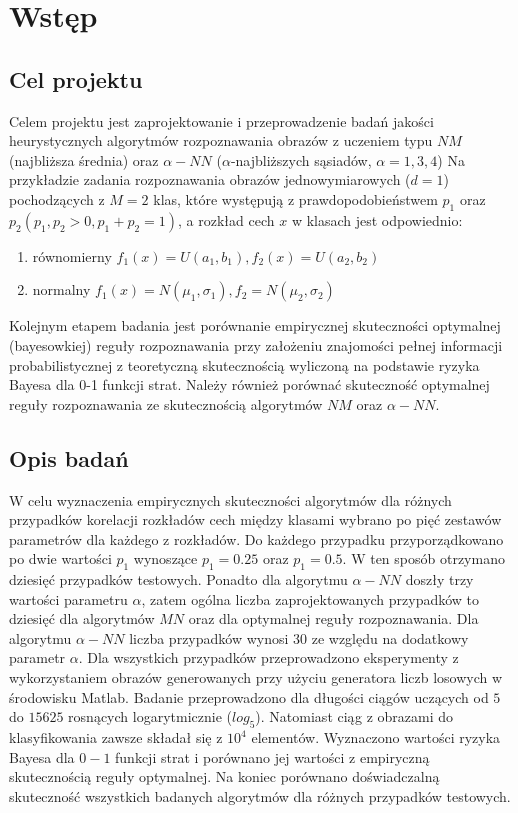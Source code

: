 \section{Wstęp}
	\subsection{Cel projektu}

	Celem projektu jest zaprojektowanie i przeprowadzenie badań jakości heurystycznych algorytmów rozpoznawania obrazów z uczeniem typu $NM$  (najbliższa średnia) oraz $\alpha-NN$ ($\alpha$-najbliższych sąsiadów, $ \alpha=1,3,4$) Na przykładzie zadania rozpoznawania obrazów jednowymiarowych ($d=1$) pochodzących z $M = 2$ klas, które występują z prawdopodobieństwem $p_1$ oraz $p_2 (p_1,p_2>0, p_1+p_2=1)$, a rozkład cech $x$ w klasach jest odpowiednio:
	\begin{enumerate}
	\item równomierny $f_1(x)=U(a_1,b_1), f_2(x)=U(a_2,b_2)$
	\item normalny $f_1(x)=N(\mu_1, \sigma_1), f_2=N(\mu_2, \sigma_2)$
	\end{enumerate}
	Kolejnym etapem badania jest porównanie empirycznej skuteczności optymalnej (bayesowkiej) reguły rozpoznawania przy założeniu znajomości pełnej informacji probabilistycznej z teoretyczną skutecznością wyliczoną na podstawie ryzyka Bayesa dla 0-1 funkcji strat. Należy również porównać skuteczność optymalnej reguły rozpoznawania ze skutecznością algorytmów $NM$ oraz $\alpha-NN$.
	
	\subsection{Opis badań}
	
	W celu wyznaczenia empirycznych skuteczności algorytmów dla różnych przypadków korelacji rozkładów cech między klasami wybrano po pięć zestawów parametrów dla każdego z rozkładów. Do każdego przypadku przyporządkowano po dwie wartości $p_1$ wynoszące $p_1=0.25$ oraz $p_1=0.5$. W ten sposób otrzymano dziesięć przypadków testowych. Ponadto dla algorytmu $\alpha-NN$ doszły trzy wartości parametru $\alpha$, zatem ogólna liczba zaprojektowanych przypadków to dziesięć dla algorytmów $MN$ oraz dla optymalnej reguły rozpoznawania. Dla algorytmu $\alpha-NN$ liczba przypadków wynosi 30 ze względu na dodatkowy parametr $\alpha$. \newline
	Dla wszystkich przypadków przeprowadzono eksperymenty z wykorzystaniem obrazów generowanych przy użyciu generatora liczb losowych w środowisku  Matlab. Badanie przeprowadzono dla długości ciągów uczących od $5$ do $15 625$ rosnących logarytmicznie ($log_5$). Natomiast ciąg z obrazami do klasyfikowania zawsze składał się z $10^4$ elementów.
	Wyznaczono wartości ryzyka Bayesa dla $0-1$ funkcji strat i porównano jej wartości z empiryczną skutecznością reguły optymalnej. \newline
	Na koniec porównano doświadczalną skuteczność wszystkich badanych algorytmów dla różnych przypadków testowych.
	
